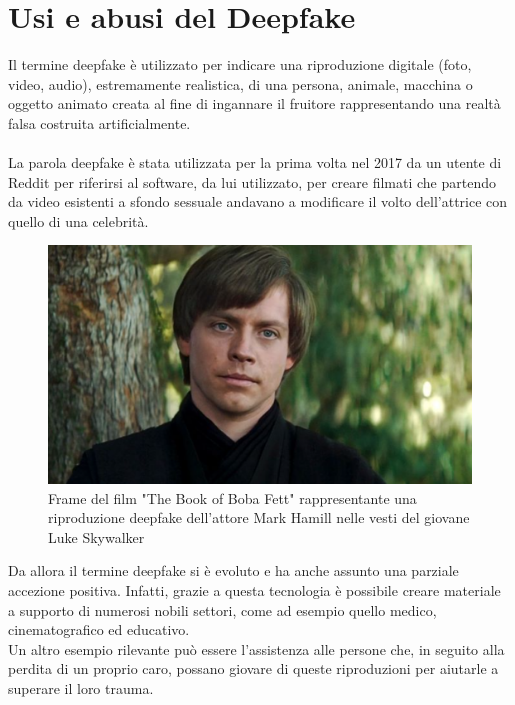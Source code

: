 \documentclass[12pt, a4paper]{article}
\begin{document}


\newpage
\section{Usi e abusi del Deepfake}
Il termine deepfake è utilizzato per indicare una riproduzione digitale (foto, video, audio), estremamente realistica, di una persona, animale, macchina o oggetto animato creata al fine di ingannare il fruitore rappresentando una realtà falsa costruita artificialmente.\\\\
La parola deepfake è stata utilizzata per la prima volta nel 2017 da un utente di Reddit per riferirsi al software, da lui utilizzato, per creare filmati che partendo da video esistenti a sfondo sessuale andavano a modificare il volto dell'attrice con quello di una celebrità\cite{OrigineDeepfake}. 
\\
\begin{figure}
\includegraphics[width=1\linewidth]{img/Luke}
\caption{Frame del film "The Book of Boba Fett" rappresentante una riproduzione deepfake dell'attore Mark Hamill nelle vesti del giovane Luke Skywalker}
\label{fig:wrapfig}
\end{figure}
Da allora il termine deepfake si è evoluto e ha anche assunto una parziale accezione positiva. Infatti, grazie a questa tecnologia è possibile creare materiale a supporto di numerosi nobili settori, come ad esempio quello medico, cinematografico ed educativo.\cite{LukeDeepfake}\\
Un altro esempio rilevante può essere l'assistenza alle persone che, in seguito alla perdita di un proprio caro, possano giovare di queste riproduzioni per aiutarle a superare il loro trauma\cite{SuperareTrauma}.
\end{document}
